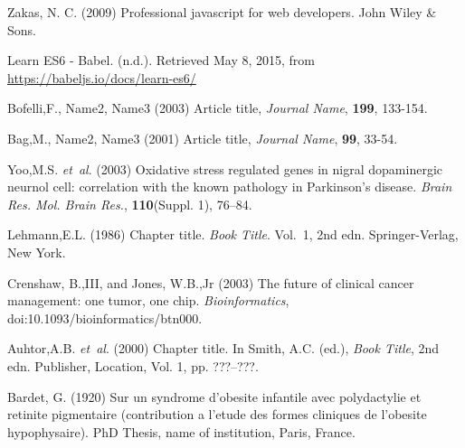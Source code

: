 \documentclass{bioinfo}
\begin{document}
%
%
%
%
%
%
%
%
%


\begin{thebibliography}{}
Zakas, N. C. (2009) Professional javascript for web developers. John Wiley \& Sons.

Learn ES6 - Babel. (n.d.). Retrieved May 8, 2015, from 
\url{https://babeljs.io/docs/learn-es6/}



 Bofelli,F., Name2, Name3 (2003) Article title, {\it Journal Name}, {\bf 199}, 133-154.

 Bag,M., Name2, Name3 (2001) Article title, {\it Journal Name}, {\bf 99}, 33-54.

Yoo,M.S. \textit{et~al}. (2003) Oxidative stress regulated genes
in nigral dopaminergic neurnol cell: correlation with the known
pathology in Parkinson's disease. \textit{Brain Res. Mol. Brain
Res.}, \textbf{110}(Suppl. 1), 76--84.

Lehmann,E.L. (1986) Chapter title. \textit{Book Title}. Vol.~1, 2nd edn. Springer-Verlag, New York.

Crenshaw, B.,III, and Jones, W.B.,Jr (2003) The future of clinical
cancer management: one tumor, one chip. \textit{Bioinformatics},
doi:10.1093/bioinformatics/btn000.

Auhtor,A.B. \textit{et~al}. (2000) Chapter title. In Smith, A.C.
(ed.), \textit{Book Title}, 2nd edn. Publisher, Location, Vol. 1, pp.
???--???.

Bardet, G. (1920) Sur un syndrome d'obesite infantile avec
polydactylie et retinite pigmentaire (contribution a l'etude des
formes cliniques de l'obesite hypophysaire). PhD Thesis, name of
institution, Paris, France.

\end{thebibliography}
\end{document}

